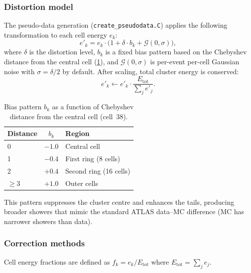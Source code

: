 \documentclass[12pt,a4paper]{article}
\begin{document}
\subsubsection{Distortion model}

The pseudo-data generation (\texttt{create\_pseudodata.C}) applies the
following transformation to each cell energy $e_k$:
\begin{equation}
  e'_k = e_k \cdot \bigl(1 + \delta \cdot b_k + \mathcal{G}(0,\sigma)\bigr),
  \label{eq:distortion}
\end{equation}
where $\delta$ is the distortion level, $b_k$ is a fixed bias pattern
based on the Chebyshev distance from the central cell (\cref{tab:bias}),
and $\mathcal{G}(0,\sigma)$ is per-event per-cell Gaussian noise with
$\sigma = \delta/2$ by default. After scaling, total cluster energy is
conserved:
\begin{equation}
  e'_k \leftarrow e'_k \cdot \frac{E_\text{tot}}{\sum_j e'_j}.
\end{equation}

\begin{table}[htbp]
\centering
\caption{Bias pattern $b_k$ as a function of Chebyshev distance from
  the central cell (cell~38).}
\label{tab:bias}
\begin{tabular}{lcl}
\toprule
\textbf{Distance} & \textbf{$b_k$} & \textbf{Region} \\
\midrule
0 & $-1.0$ & Central cell \\
1 & $-0.4$ & First ring (8 cells) \\
2 & $+0.4$ & Second ring (16 cells) \\
$\geq 3$ & $+1.0$ & Outer cells \\
\bottomrule
\end{tabular}
\end{table}

This pattern suppresses the cluster centre and enhances the tails,
producing broader showers that mimic the standard ATLAS data--MC
difference (MC has narrower showers than data).

\subsubsection{Correction methods}
\label{sec:running:methods}

Cell energy fractions are defined as $f_k = e_k / E_\text{tot}$ where
$E_\text{tot} = \sum_j e_j$.
\end{document}
